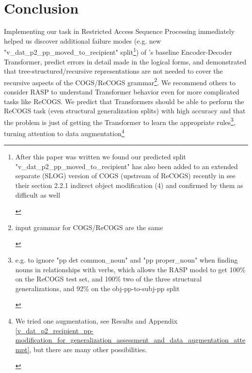 \documentclass[11pt]{article}
\begin{document}
\section{Conclusion} 
Implementing our task in Restricted Access Sequence Processing immediately helped us discover additional failure modes (e.g. new "v\_dat\_p2\_pp\_moved\_to\_recipient" split\footnote{\begin{footnotesize}After this paper was written we found our predicted split "v\_dat\_p2\_pp\_moved\_to\_recipient" has also been added to an extended separate (SLOG) version of COGS (upstream of ReCOGS) recently in \cite{li2023slogstructuralgeneralizationbenchmark} see their section 2.2.1 indirect object modification (4) and confirmed by them as difficult as well
\end{footnotesize}
}) of \cite{Wu2023}'s baseline Encoder-Decoder Transformer, predict errors in detail made in the logical forms, and demonstrated that tree-structured/recursive representations are not needed to cover the recursive aspects of the COGS/ReCOGS grammar\footnote{\begin{footnotesize}input grammar for COGS/ReCOGS are the same\end{footnotesize}}. We recommend others to consider RASP to understand Transformer behavior even for more complicated tasks like ReCOGS. We predict that Transformers should be able to perform the ReCOGS task (even structural generalization splits) with high accuracy and that the problem is just of getting the Transformer to learn the appropriate rules\footnote{\begin{footnotesize}e.g. to ignore "pp det common\_noun" and "pp proper\_noun" when finding nouns in relationships with verbs, which allows the RASP model to get 100\% on the ReCOGS test set, and 100\% two of the three structural generalizations, and 92\% on the obj-pp-to-subj-pp split\end{footnotesize}}, turning attention to data augmentation\footnote{\begin{footnotesize}We tried one augmentation, see Results and Appendix \ref{v_dat_p2_recipient_pp-modification_for_generalization_assessment_and_data_augmentation_attempt}, but there are many other possibilities.

\end{footnotesize}}
\end{document}
